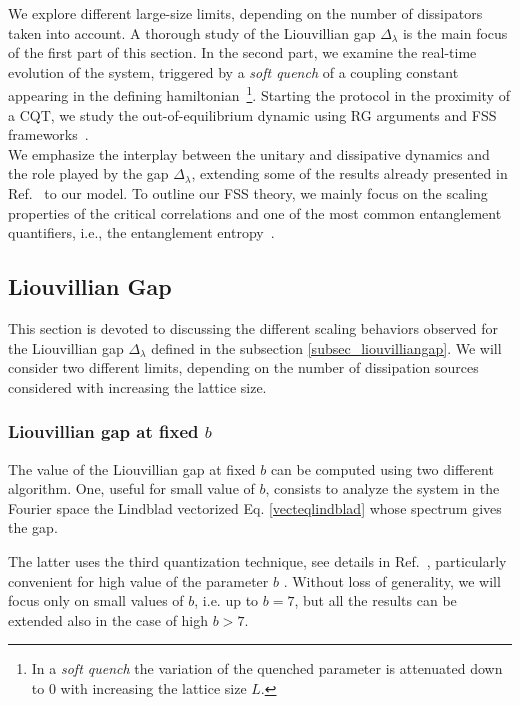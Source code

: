 We explore different large-size limits, depending on the number of dissipators taken into account. A thorough study of the Liouvillian gap $\Delta_\lambda$ is the main focus of the first part of this section. In the second part, we examine the real-time evolution of the system, triggered by a \textit{soft quench} of a coupling constant appearing in the defining hamiltonian~\footnote{In a \textit{soft quench} the variation of the quenched parameter is attenuated down to $0$ with increasing the lattice size $L$.}. Starting the protocol in the proximity of a CQT, we study the out-of-equilibrium dynamic using RG arguments and FSS frameworks~\cite{C-1996-ScalingandRG, RV-2021-coherentanddissipativedynamicsreview}.\\

We emphasize the interplay between the unitary and dissipative dynamics and the role played by the gap $\Delta_\lambda$, extending some of the results already presented in Ref.~\cite{NRV-2019-competingdissipativeandcoherent} to our model. To outline our FSS theory, we mainly focus on the scaling properties of the critical correlations and one of the most common entanglement quantifiers, i.e., the entanglement entropy~\cite{ZMZ-2021-Renyientropiesopen}.



\subsection{Liouvillian Gap}

This section is devoted to discussing the different scaling behaviors observed for the Liouvillian gap $\Delta_\lambda$ defined in the subsection \ref{subsec_liouvilliangap}. We will consider two different limits, depending on the number of dissipation sources considered with increasing the lattice size.


\subsubsection{Liouvillian gap at fixed $b$}

The value of the Liouvillian gap at fixed $b$ can be computed using two different algorithm.
One, useful for small value of $b$, consists to analyze the system in the Fourier space 
the Lindblad vectorized Eq. \eqref{vecteqlindblad} whose spectrum gives the gap. 

The latter uses the third quantization technique, see details in 
Ref.~\cite{P-2008-thirdquantization}, particularly convenient for high value of the 
parameter $b$ \cite{franchi2023liouvillian}. Without loss of generality, we will focus only
on small values of $b$, i.e. up to $b=7$, but all the results can be extended also in
the case of high $b>7$.\\

